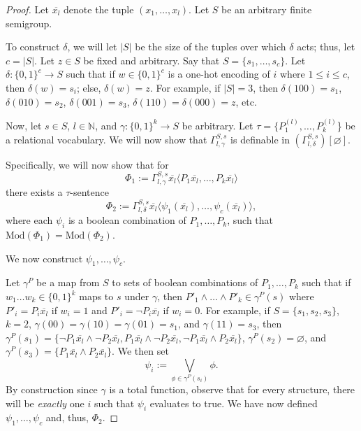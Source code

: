 \documentclass[a4paper,UKenglish,cleveref, autoref, thm-restate, anonymous]{lipics-v2021}
\begin{document}
\begin{proof}
    Let $\overline{x_l}$ denote the tuple $(x_1,\dots,x_l)$. Let $S$ be an arbitrary finite semigroup.

    To construct $\delta$, we will let $|S|$ be the size of the tuples over which $\delta$ acts; thus, let $c = |S|$. Let $z \in S$ be fixed and arbitrary. Say that $S = \{s_1, \dots, s_c\}$. Let $\delta : \{0,1\}^c \rightarrow S$ such that if $w \in \{0,1\}^c$ is a one-hot encoding of $i$ where $1 \leq i \leq c$, then $\delta(w) = s_i$; else, $\delta(w) = z$. For example, if $|S| = 3$, then $\delta(100) = s_1$, $\delta(010) = s_2$, $\delta(001) = s_3$, $\delta(110) = \delta(000) = z$, etc.

    Now, let $s \in S$, $l \in \mathbb{N}$, and $\gamma : \{0,1\}^k \rightarrow S$ be arbitrary. Let $\tau = \{P_1^{(l)}, \dots, P_k^{(l)}$\} be a relational vocabulary. We will now show that $\Gamma^{S,s}_{l,\gamma}$ is definable in $(\Gamma^{S,s}_{l,\delta})[\varnothing]$.

    Specifically, we will now show that for \[
        \Phi_1 := \Gamma^{S,s}_{l,\gamma}\overline{x_l}\langle P_1 \overline{x_l}, \dots, P_k \overline{x_l}\rangle
    \] there exists a $\tau$-sentence \[
        \Phi_2 := \Gamma^{S,s}_{l,\delta}\overline{x_l}\langle \psi_1(\overline{x_l}), \dots, \psi_c(\overline{x_l})\rangle,
    \] where each $\psi_i$ is a boolean combination of $P_1,\dots,P_k$,
    such that \(
        \text{Mod}(\Phi_1) = \text{Mod}(\Phi_2)
    \).
    
    We now construct $\psi_1, \dots, \psi_c$.

    Let $\gamma^P$ be a map from $S$ to sets of boolean combinations of $P_1,\dots,P_k$ such that if $w_1\dots w_k \in \{0,1\}^k$ maps to $s$ under $\gamma$, then $P'_1 \wedge \dots \wedge P'_k \in \gamma^P(s)$ where $P'_i = P_i \overline{x_l}$ if $w_i = 1$ and $P'_i = \neg P_i \overline{x_l}$ if $w_i = 0$. For example, if $S = \{s_1, s_2, s_3\}$, $k=2$, $\gamma(00) = \gamma(10) = \gamma(01) = s_1$, and $\gamma(11) = s_3$, then $\gamma^P(s_1) = \{\neg P_1\overline{x_l} \wedge \neg P_2\overline{x_l}, P_1\overline{x_l} \wedge \neg P_2\overline{x_l}, \neg P_1\overline{x_l} \wedge P_2\overline{x_l}\}$, $\gamma^P(s_2) = \varnothing$, and $\gamma^P(s_3) = \{P_1\overline{x_l} \wedge P_2\overline{x_l}\}$. We then set \[\psi_i := \bigvee_{\phi \in \gamma^P(s_i)} \phi.\] By construction since $\gamma$ is a total function, observe that for every structure, there will be \emph{exactly} one $i$ such that $\psi_i$ evaluates to true. We have now defined $\psi_1, \dots, \psi_c$ and, thus, $\Phi_2$.
    

\end{proof}
\end{document}
